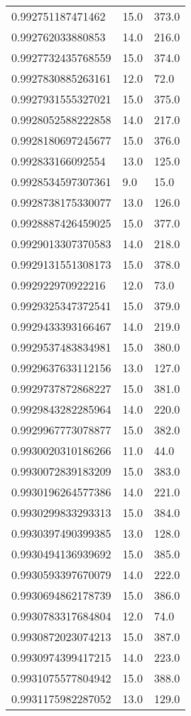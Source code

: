 \begin{center}
\begin{supertabular}[H]{p{0.30\textwidth}p{0.05\textwidth}p{0.05\textwidth}}
0.992751187471462 & 15.0 & 373.0 \\ 
0.992762033880853 & 14.0 & 216.0 \\ 
0.9927732435768559 & 15.0 & 374.0 \\ 
0.9927830885263161 & 12.0 & 72.0 \\ 
0.9927931555327021 & 15.0 & 375.0 \\ 
0.9928052588222858 & 14.0 & 217.0 \\ 
0.9928180697245677 & 15.0 & 376.0 \\ 
0.992833166092554 & 13.0 & 125.0 \\ 
0.9928534597307361 & 9.0 & 15.0 \\ 
0.9928738175330077 & 13.0 & 126.0 \\ 
0.9928887426459025 & 15.0 & 377.0 \\ 
0.9929013307370583 & 14.0 & 218.0 \\ 
0.9929131551308173 & 15.0 & 378.0 \\ 
0.992922970922216 & 12.0 & 73.0 \\ 
0.9929325347372541 & 15.0 & 379.0 \\ 
0.9929433393166467 & 14.0 & 219.0 \\ 
0.9929537483834981 & 15.0 & 380.0 \\ 
0.9929637633112156 & 13.0 & 127.0 \\ 
0.9929737872868227 & 15.0 & 381.0 \\ 
0.9929843282285964 & 14.0 & 220.0 \\ 
0.9929967773078877 & 15.0 & 382.0 \\ 
0.9930020310186266 & 11.0 & 44.0 \\ 
0.9930072839183209 & 15.0 & 383.0 \\ 
0.9930196264577386 & 14.0 & 221.0 \\ 
0.9930299833293313 & 15.0 & 384.0 \\ 
0.9930397490399385 & 13.0 & 128.0 \\ 
0.9930494136939692 & 15.0 & 385.0 \\ 
0.9930593397670079 & 14.0 & 222.0 \\ 
0.9930694862178739 & 15.0 & 386.0 \\ 
0.9930783317684804 & 12.0 & 74.0 \\ 
0.9930872023074213 & 15.0 & 387.0 \\ 
0.9930974399417215 & 14.0 & 223.0 \\ 
0.9931075577804942 & 15.0 & 388.0 \\ 
0.9931175982287052 & 13.0 & 129.0 \\ 

\end{supertabular}
\end{center}
